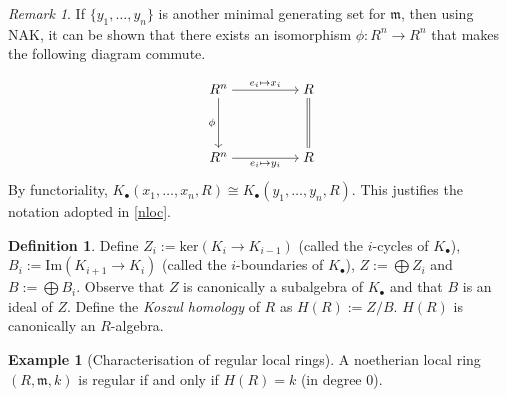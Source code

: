 \documentclass[oneside,11pt,reqno]{amsart}
\theoremstyle{definition}
\newtheorem{ex}[thm]{Example}
\newtheorem{defn}[thm]{Definition}
\theoremstyle{remark}
\newtheorem{rem}[thm]{Remark}
\begin{document}
\begin{rem}
 If $\{ y_{1},\ldots ,y_{n} \} $ is another minimal generating set for $\mathfrak{m} $, then using NAK, it can be shown that there exists an isomorphism $\phi :R^{n} \rightarrow R^{n}$ that makes the following diagram commute.

\[\begin{tikzcd}[cramped]
	{R^n} && R \\
	\\
	{R^n} && R
	\arrow["{e_i \mapsto x_i}", from=1-1, to=1-3]
	\arrow["\phi"', from=1-1, to=3-1]
	\arrow[equals, from=1-3, to=3-3]
	\arrow["{e_i \mapsto y_i}"', from=3-1, to=3-3]
\end{tikzcd}\]
By functoriality, $K_{\bullet}(x_{1},\ldots ,x_{n},R)\cong K_{\bullet}(y_{1},\ldots ,y_{n},R)$. This justifies the notation adopted in \cref{nloc}.
\end{rem}

\begin{defn}
	Define $Z_{i}:=\text{ker}(K_{i}\rightarrow K_{i-1})$ (called the $i$-cycles of $K_{\bullet}$), $B_{i}:=\text{Im}(K_{i+1}\rightarrow K_{i})$ (called the $i$-boundaries of $K_{\bullet}$), $Z:=\bigoplus Z_{i}$ and $B:=\bigoplus B_{i}$. Observe that $Z$ is canonically a subalgebra of $K_{\bullet}$ and that $B$ is an ideal of $Z$. Define the \emph{Koszul homology} of $R$ as $H(R):=Z/B$. $H(R)$ is canonically an $R$-algebra.    
\end{defn}




\begin{ex}[Characterisation of regular local rings]
 A noetherian local ring $(R,\mathfrak{m},k)$ is regular if and only if $H(R)=k$ (in degree $0$).
\end{ex}
\end{document}
